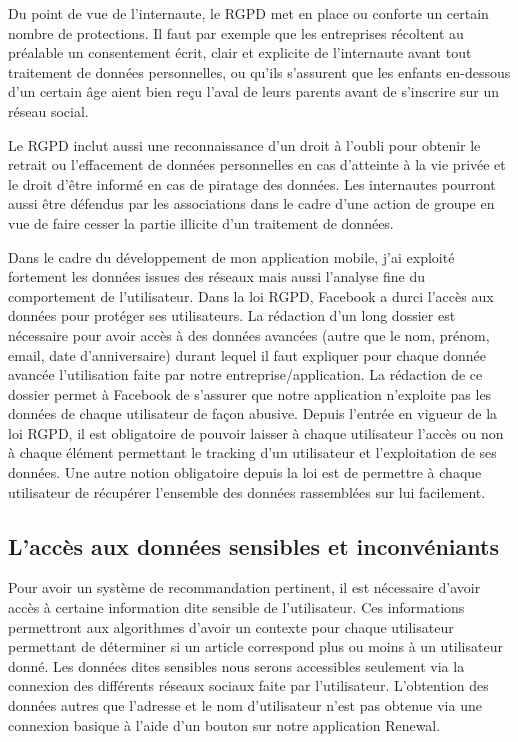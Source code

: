 Du point de vue de l’internaute, le RGPD met en place ou conforte un certain nombre de protections. Il faut par exemple que les entreprises récoltent au préalable un consentement écrit, clair et explicite de l’internaute avant tout traitement de données personnelles, ou qu’ils s’assurent que les enfants en-dessous d’un certain âge aient bien reçu l’aval de leurs parents avant de s’inscrire sur un réseau social.

Le RGPD inclut aussi une reconnaissance d’un droit à l’oubli pour obtenir le retrait ou l’effacement de données personnelles en cas d’atteinte à la vie privée et le droit d’être informé en cas de piratage des données. Les internautes pourront aussi être défendus par les associations dans le cadre d’une action de groupe en vue de faire cesser la partie illicite d’un traitement de données.

Dans le cadre du développement de mon application mobile, j'ai exploité fortement les données issues des réseaux mais aussi l’analyse fine du comportement de l’utilisateur. Dans la loi RGPD, Facebook a durci l’accès aux données pour protéger ses utilisateurs. La rédaction d’un long dossier est nécessaire pour avoir accès à des données avancées (autre que le nom, prénom, email, date d’anniversaire) durant lequel il faut expliquer pour chaque donnée avancée l’utilisation faite par notre entreprise/application.  La rédaction de ce dossier permet à Facebook de s’assurer que notre application n’exploite pas les données de chaque utilisateur de façon abusive. Depuis l’entrée en vigueur de la loi RGPD, il est obligatoire de pouvoir laisser à chaque utilisateur l’accès ou non à chaque élément permettant le tracking d’un utilisateur et l’exploitation de ses données. Une autre notion obligatoire depuis la loi est de permettre à chaque utilisateur de récupérer l’ensemble des données rassemblées sur lui facilement.


\subsection{L'accès aux données sensibles et inconvéniants }

Pour avoir un système de recommandation pertinent, il est nécessaire d'avoir accès à certaine information dite sensible de l’utilisateur. Ces informations permettront aux algorithmes d'avoir un contexte pour chaque utilisateur permettant de déterminer si un article correspond plus ou moins à un utilisateur donné. Les données dites sensibles nous serons accessibles seulement via la connexion des différents réseaux sociaux faite par l'utilisateur. L'obtention des données autres que l’adresse et le nom d'utilisateur n'est pas obtenue via une connexion basique à l'aide d'un bouton sur notre application Renewal. 


